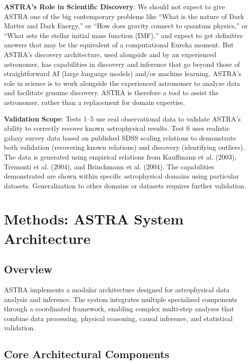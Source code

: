 \documentclass[usenatbib]{rasti}
\begin{document}
\textbf{ASTRA's Role in Scientific Discovery}: We should not expect to give ASTRA one of the big contemporary problems like ``What is the nature of Dark Matter and Dark Energy,'' or ``How does gravity connect to quantum physics,'' or ``What sets the stellar initial mass function (IMF),'' and expect to get definitive answers that may be the equivalent of a computational Eureka moment. But ASTRA's discovery architecture, used alongside and by an experienced astronomer, has capabilities in discovery and inference that go beyond those of straightforward AI (large language models) and/or machine learning. ASTRA's role in science is to work alongside the experienced astronomer to analyze data and facilitate genuine discovery. ASTRA is therefore a tool to assist the astronomer, rather than a replacement for domain expertise.

\textbf{Validation Scope}: Tests 1--5 use real observational data to validate ASTRA's ability to correctly recover known astrophysical results. Test 6 uses realistic galaxy survey data based on published SDSS scaling relations to demonstrate both validation (recovering known relations) and discovery (identifying outliers). The data is generated using empirical relations from Kauffmann et al. (2003), Tremonti et al. (2004), and Brinchmann et al. (2004). The capabilities demonstrated are shown within specific astrophysical domains using particular datasets. Generalization to other domains or datasets requires further validation.

\section{Methods: ASTRA System Architecture}

\subsection{Overview}

ASTRA implements a modular architecture designed for astrophysical data analysis and inference. The system integrates multiple specialized components through a coordinated framework, enabling complex multi-step analyses that combine data processing, physical reasoning, causal inference, and statistical validation.

\subsection{Core Architectural Components}
\end{document}
